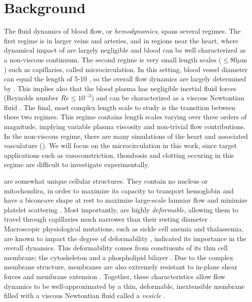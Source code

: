 \section{Background}
The fluid dynamics of blood flow, or \textit{hemodynamics}, spans several regimes. 
The first regime is in larger veins and arteries, and in regions near the heart, where dynamical impact of \rbcs are largely negligible and blood can be well characterized as a non-viscous continuum. 
The second regime is very small length scales ($\leq 80 \mu$m ) such as capillaries, called microcirculation.
In this setting, blood vessel diameter can equal the length of 5-10 \rbcs {}, so the overall flow dynamics are largely determined by \rbcs. 
 This implies also that the blood plasma has negligible inertial fluid forces (Reynolds number $Re \leq 10^{-3}$) and can be characterized as a viscous Newtontian fluid \cite{cortinovis2006capillary}.
The final, most complex length scale to study is the transition between these two regimes.%
This regime contains length scales varying over three orders of magnitude, implying variable plasma viscosity and non-trivial \rbc flow contributions.
In the non-viscous regime, there are many simulations of the heart and associated vasculature ().
We will focus on the microcirculation in this work, since target applications such as vasoconstriction, thombosis and clotting occuring in this regime are difficult to investigate experimentally.

\rbcs are somewhat unique cellular structures. 
They contain no nucleus or mitochondira, in order to maximize its capacity to transport hemoglobin \cite{zhang2011red} and have a biconcave shape at rest to maximize large-scale lamniar flow and minimize platelet scattering \cite{uzoigwe2006human}.
Most importantly, \rbcs are highly \textit{deformable}, allowing them to travel through capillaries much narrower than their resting diameter \cite{huisjes2018squeezing}.
Macroscopic physiological mutations, such as sickle cell anemia and thalassemia, are known to impact the degree of \rbc deformability \cite{huisjes2018squeezing}, indicated its importance in the overall dynamics.
This deformability comes from constiuents of its thin cell membrane: the cytoskeleton and a phospholipid bilayer .
Due to the complex membrane structure, \rbc membranes are also extremely resistant to in-plane shear forces and membrane extension \cite{lee2008theoretical}.
Together, these characteristics allow \rbc flow dynamics to be well-approximated by a thin, deformable, inextensible membrane filled with a viscous Newtontian fluid called a \textit{vesicle} .

